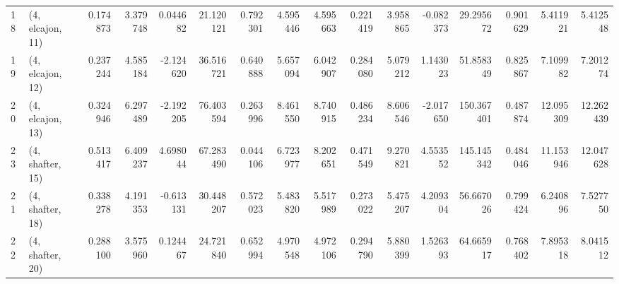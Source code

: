 \begin{tabular}{llrrrrrrrrrrrrrr}
18 &  (4, elcajon, 11) &   0.174873 &  3.379748 &  0.044682 &   21.120121 &  0.792301 &   4.595446 &   4.595663 &  0.221419 &   3.958865 & -0.082373 &   29.295672 &  0.901629 &   5.411921 &   5.412548 \\
19 &  (4, elcajon, 12) &   0.237244 &  4.585184 & -2.124620 &   36.516721 &  0.640888 &   5.657094 &   6.042907 &  0.284080 &   5.079212 &  1.143023 &   51.858349 &  0.825867 &   7.109982 &   7.201274 \\
20 &  (4, elcajon, 13) &   0.324946 &  6.297489 & -2.192205 &   76.403594 &  0.263996 &   8.461550 &   8.740915 &  0.486234 &   8.606546 & -2.017650 &  150.367401 &  0.487874 &  12.095309 &  12.262439 \\
23 &  (4, shafter, 15) &   0.513417 &  6.409237 &  4.698044 &   67.283490 &  0.044106 &   6.723977 &   8.202651 &  0.471549 &   9.270821 &  4.553552 &  145.145342 &  0.484046 &  11.153946 &  12.047628 \\
21 &  (4, shafter, 18) &   0.338278 &  4.191353 & -0.613131 &   30.448207 &  0.572023 &   5.483820 &   5.517989 &  0.273022 &   5.475207 &  4.209304 &   56.667026 &  0.799424 &   6.240896 &   7.527750 \\
22 &  (4, shafter, 20) &   0.288100 &  3.575960 &  0.124467 &   24.721840 &  0.652994 &   4.970548 &   4.972106 &  0.294790 &   5.880399 &  1.526393 &   64.665917 &  0.768402 &   7.895318 &   8.041512 \\
\bottomrule
\end{tabular}
